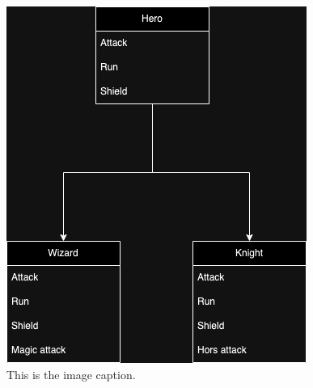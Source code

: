 \documentclass{article}
\begin{document}
\begin{figure}[h]
\begin{minipage}[t]{0.48\linewidth}
            \includegraphics[width=\textwidth]{test.png}
        \end{minipage}
        \caption{This is the image caption.}
        \label{fig:my_image}
    \end{figure}
\end{document}
